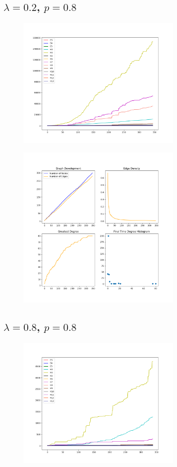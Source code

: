 \FloatBarrier

\subsection*{$\lambda=0.2$, $p=0.8$}

\begin{figure}[h!]
    \includegraphics[width=8cm]{Images/twitter_sim_for_stats_3_0.2_0.8.png}
    \centering
\end{figure}


\begin{figure}[h!]
    \includegraphics[width=8cm]{Images/twitter_sim_stats_3_0.2_0.8.png}
    \centering
\end{figure}

\FloatBarrier

\subsection*{$\lambda=0.8$, $p=0.8$}

\begin{figure}[h!]
    \includegraphics[width=8cm]{Images/twitter_sim_for_stats_3_0.8_0.8.png}
    \centering
\end{figure}


